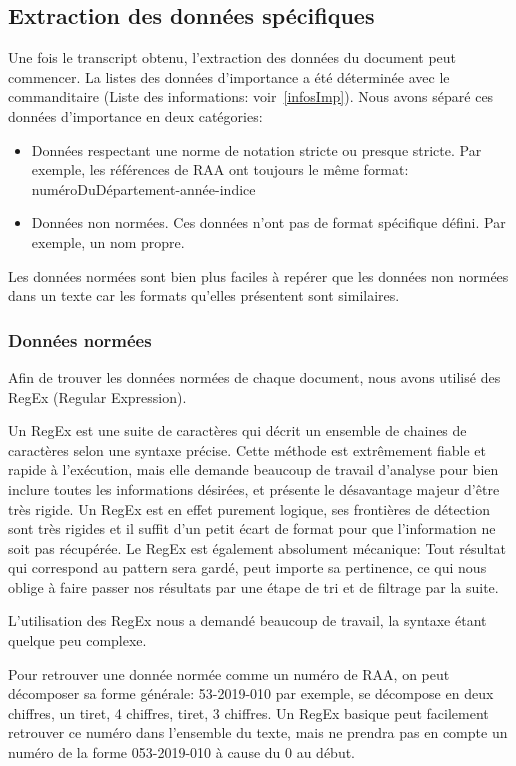 \subsection{Extraction des données spécifiques}
Une fois le transcript obtenu, l'extraction des données du document peut commencer.
La listes des données d'importance a été déterminée avec le commanditaire (Liste des informations: voir~\ref{infosImp}).
Nous avons séparé ces données d'importance en deux catégories:
\begin{itemize}
\item Données respectant une norme de notation stricte ou presque stricte.\newline
Par exemple, les références de RAA ont toujours le même format: numéroDuDépartement-année-indice
\item Données non normées.\newline
Ces données n'ont pas de format spécifique défini.
Par exemple, un nom propre.
\end{itemize}

Les données normées sont bien plus faciles à repérer que les données non normées dans un texte car les formats qu'elles présentent sont similaires.

\subsubsection{Données normées}
Afin de trouver les données normées de chaque document, nous avons utilisé des RegEx (Regular Expression).

Un RegEx est une suite de caractères qui décrit un ensemble de chaines de caractères selon une syntaxe précise.
Cette méthode est extrêmement fiable et rapide à l'exécution, mais elle demande beaucoup de travail d'analyse pour bien inclure toutes les informations désirées, et présente le désavantage majeur d'être très rigide.
Un RegEx est en effet purement logique, ses frontières de détection sont très rigides et il suffit d'un petit écart de format pour que l'information ne soit pas récupérée.
Le RegEx est également absolument mécanique: Tout résultat qui correspond au pattern sera gardé, peut importe sa pertinence, ce qui nous oblige à faire passer nos résultats par une étape de tri et de filtrage par la suite.

L'utilisation des RegEx nous a demandé beaucoup de travail, la syntaxe étant quelque peu complexe.

Pour retrouver une donnée normée comme un numéro de RAA, on peut décomposer sa forme générale: 53-2019-010 par exemple, se décompose en deux chiffres, un tiret, 4 chiffres, tiret, 3 chiffres.
Un RegEx basique peut facilement retrouver ce numéro dans l'ensemble du texte, mais ne prendra pas en compte un numéro de la forme 053-2019-010 à cause du 0 au début.


